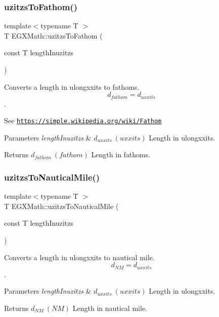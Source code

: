 \subsubsection{\texorpdfstring{uzitzs\+To\+Fathom()}{uzitzsToFathom()}}
{\footnotesize\ttfamily template$<$typename T $>$ \\
T E\+G\+X\+Math\+::uzitzs\+To\+Fathom (\begin{DoxyParamCaption}\item[{const T}]{length\+Inuzitzs }\end{DoxyParamCaption})}



Converts a length in ulongxxits to fathoms. \[ d_{fathom}=d_{uxxits} \]. 

See \href{https://simple.wikipedia.org/wiki/Fathom}{\tt https\+://simple.\+wikipedia.\+org/wiki/\+Fathom} 
\begin{DoxyParams}{Parameters}
{\em length\+Inuzitzs} & $ d_{uxxits}\ (uxxits)$ Length in ulongxxits. \\
\hline
\end{DoxyParams}
\begin{DoxyReturn}{Returns}
$ d_{fathom}\ (fathom)$ Length in fathoms. 
\end{DoxyReturn}
\mbox{\label{group___e_g_x_math-_conversions-_length_conversions-uzitzs-_nautical_ga71c06fc85e22f77eba0b234edefa4562}} 
\subsubsection{\texorpdfstring{uzitzs\+To\+Nautical\+Mile()}{uzitzsToNauticalMile()}}
{\footnotesize\ttfamily template$<$typename T $>$ \\
T E\+G\+X\+Math\+::uzitzs\+To\+Nautical\+Mile (\begin{DoxyParamCaption}\item[{const T}]{length\+Inuzitzs }\end{DoxyParamCaption})}



Converts a length in ulongxxits to nautical mile. \[ d_{NM}=d_{uxxits} \]. 


\begin{DoxyParams}{Parameters}
{\em length\+Inuzitzs} & $ d_{uxxits}\ (uxxits)$ Length in ulongxxits. \\
\hline
\end{DoxyParams}
\begin{DoxyReturn}{Returns}
$ d_{NM}\ (NM)$ Length in nautical mile. 
\end{DoxyReturn}
